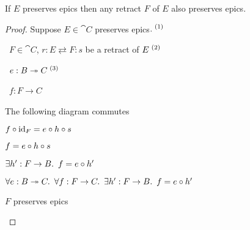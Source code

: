 \begin{prop}
  If $E$ preserves epics then any retract $F$ of $E$ also preserves epics.

  \begin{proof}
    Suppose $E\in\cat{C}$ preserves epics$.^{\text~(1)}$

    \begin{itemize}
      \step
        \begin{itemize}
          \subp{\star}
            \Let~$F \in \cat{C}$, $r : E \rightleftarrows F : s$ be a retract of $E^{\text~(2)}$
            \marginnote{\Hyp}

          \step
            \begin{itemize}
              \subp{\dagger}
                \Let~$e : B \twoheadrightarrow C^{\text~(3)}$
                \marginnote{\Hyp}

              \step
                \Let~$f : F \to C$
                \marginnote{\Hyp}

              \step[\imps]
                The following diagram commutes
                \begin{center}
                \end{center}

              \step[\imps] $f\circ\operatorname{id}_F = e\circ h\circ s$

              \step[\imps] $f = e\circ h\circ s$
                \marginnote{\Def-$\id$}

              \step[\imps] $\exists h^\prime : F\to B\ldotp~f = e\circ h^\prime$
                \marginnote{$\exists$-\Intro}
            \end{itemize}
            \step[\imps]
              $\forall e : B \twoheadrightarrow C\ldotp~\forall f : F \to C\ldotp~\exists h^\prime : F\to B\ldotp~f = e\circ h^\prime$
              \marginnote{$\forall$-\Intro}

            \step[\iffs] $F$ preserves epics
              \marginnote{\Thm-\ref{prop:epic-preserving}}
              \qedhere
        \end{itemize}
    \end{itemize}
  \end{proof}
\end{prop}

